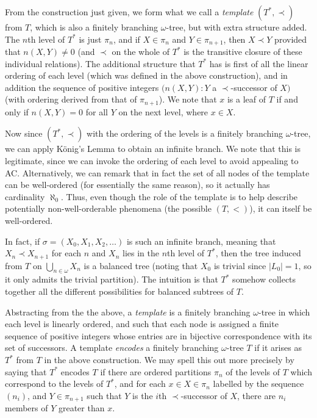 \documentclass[a4paper,reqno]{amsart}
\numberwithin{equation}{section}
\begin{document}
From the construction just given, we form what we call a {\em template} $(T^*, \prec)$ from $T$, which is also a finitely 
branching $\omega$-tree, but with extra structure added. The $n$th level of $T^*$ is just $\pi_n$, and if $X \in \pi_n$ and 
$Y \in \pi_{n+1}$, then $X \prec Y$ provided that $n(X,Y) \neq 0$ (and $\prec$ on the whole of $T^*$ is the transitive
closure of these individual relations). The additional structure that $T^*$ has is first of all the linear ordering of 
each level (which was defined in the above construction), and in addition the sequence of positive integers 
$(n(X,Y): Y$ a $\prec$-successor of $X)$ (with ordering derived from that of $\pi_{n+1}$). We note that
$x$ is a leaf of $T$ if and only if $n(X,Y) = 0$ for all $Y$ on the next level, where $x \in X$.

Now since $(T^*, \prec)$ with the ordering of the levels is a finitely branching $\omega$-tree, we can apply K\"onig's
Lemma to obtain an infinite branch. We note that this is legitimate, since we can invoke the ordering of each level to avoid
appealing to AC. Alternatively, we can remark that in fact the set of all nodes of the template can be well-ordered (for
essentially the same reason), so it actually has cardinality $\aleph_0$. Thus, even though the role of the template is to 
help describe potentially non-well-orderable phenomena (the possible $(T,<)$), it can itself be well-ordered.

In fact, if $\sigma = (X_0, X_1, X_2, \ldots)$ is such an infinite branch, meaning that $X_n \prec X_{n+1}$ for each $n$ and
$X_n$ lies in the $n$th level of $T^*$, then the tree induced from $T$ on $\bigcup_{n \in \omega}X_n$ is a balanced 
tree (noting that $X_0$ is trivial since $|L_0| = 1$, so it only admits the trivial partition). The intuition 
is that $T^*$ somehow collects together all the different possibilities for balanced subtrees of $T$.

Abstracting from the the above, a {\em template} is a finitely branching $\omega$-tree in which each level is linearly ordered,
and such that each node is assigned a finite sequence of positive integers whose entries are in bijective correspondence with 
its set of successors. A template {\em encodes} a finitely branching $\omega$-tree $T$ if it arises as $T^*$ from $T$ in the 
above construction. We may spell this out more precisely by saying that $T^*$ encodes $T$ if there are ordered partitions 
$\pi_n$ of the levels of $T$ which correspond to the levels of $T^*$, and for each $x \in X \in \pi_n$ labelled by the 
sequence $(n_i)$, and $Y \in \pi_{n+1}$ such that $Y$ is the $i$th $\prec$-successor of $X$, there are $n_i$ members of $Y$
greater than $x$.
\end{document}

